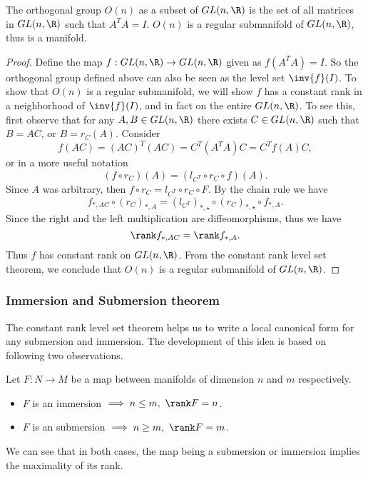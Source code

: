 \begin{proposition}
	The orthogonal group $ O(n) $ as a subset of $ GL(n,\R) $ is the set of all matrices in $ GL(n,\R) $ such that $ A^T A = I $. $ O(n) $ is a regular submanifold of $ GL(n,\R) $, thus is a manifold.
\end{proposition}
\begin{proof}
	Define the map $ f: GL(n,\R) \to GL(n,\R)  $ given as $ f(A^T A) = I $. So the orthogonal group defined above can also be seen as the level set $ \inv{f}(I) $. To show that $ O(n) $ is a regular submanifold, we will show $ f $ has a constant rank in a neighborhood of $ \inv{f}(I) $, and in fact on the entire $ GL(n,\R) $. To see this, first observe that for any $ A, B \in GL(n,\R) $ there exists $ C \in GL(n,\R) $ such that $ B = AC $, or $ B = r_C(A) $. Consider
	\[ f(AC) = (AC)^T (AC) = C^T (A^T A) C = C^T f(A) C, \]
	or in a more useful notation
	\[ (f\circ r_C)(A) = (l_{C^T}\circ r_C \circ f)(A). \]
	Since $ A $ was arbitrary, then $ f\circ r_C = l_{C^T}\circ r_C \circ F $. By the chain rule we have
	\[ f_{*,AC} \circ (r_C)_{*,A} = (l_{C^T})_{*,\star}\circ(r_C)_{*,\star} \circ f_{*,A}. \]
	Since the right and the left multiplication are diffeomorphisms, thus we have
	\[ \rank f_{*,AC} = \rank f_{*,A}. \]
	Thus $ f $ has constant rank on $ GL(n,\R) $. From the constant rank level set theorem, we conclude that $ O(n) $ is a regular submanifold of $ GL(n,\R) $.
\end{proof}

\subsubsection{Immersion and Submersion theorem}
The constant rank level set theorem helps us to write a local canonical form for any submersion and immersion. The development of this idea is based on following two observations.

\begin{observation}
	Let $ F: N\to M $ be a map between manifolds of dimension $ n $ and $ m $ respectively.
	\begin{itemize}
		\item $ F $ is an immersion $ \implies n \leq m,\ \rank F = n $.
		\item $ F $ is an submersion $ \implies  n \geq m,\ \rank F = m $.
	\end{itemize}
	We can see that in both cases, the map being a submersion or immersion implies the maximality of its rank.
\end{observation} 

